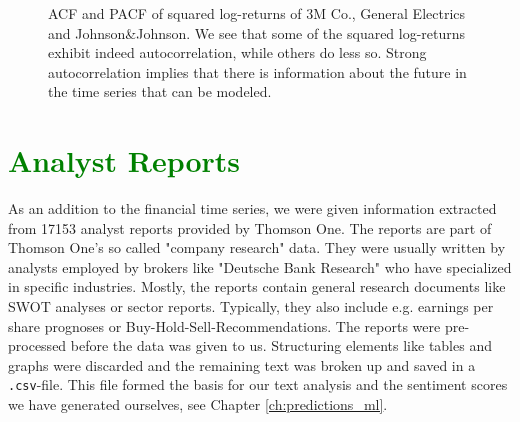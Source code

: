 \begin{figure}[H]
    \centering
    \begin{adjustbox}{width=.95\textwidth,center}
    
    \end{adjustbox}
    \begin{adjustbox}{width=.95\textwidth,center}
    
    \end{adjustbox}  
    \begin{adjustbox}{width=.95\textwidth,center}
    
    \end{adjustbox}  
    \caption{ACF and PACF of squared log-returns of 3M Co., General Electrics and Johnson\&Johnson. We see that some of the squared log-returns exhibit indeed autocorrelation, while others do less so. Strong autocorrelation implies that there is information about the future in the time series that can be modeled.}
    \label{fig:ACF_selected_squared_log_returns}
\end{figure}


\section{\textcolor{green}{Analyst Reports}}
As an addition to the financial time series, we were given information extracted from 17153 analyst reports provided by Thomson One. The reports are part of Thomson One's so called "company research" data. They were usually written by analysts employed by brokers like "Deutsche Bank Research" who have specialized in specific industries. Mostly, the reports contain general research documents like SWOT analyses or sector reports. Typically, they also include e.g. earnings per share prognoses or Buy-Hold-Sell-Recommendations. The reports were pre-processed before the data was given to us. Structuring elements like tables and graphs were discarded and the remaining text was broken up and saved in a \texttt{.csv}-file. This file formed the basis for our text analysis and the sentiment scores we have generated ourselves, see Chapter \ref{ch:predictions_ml}. 

